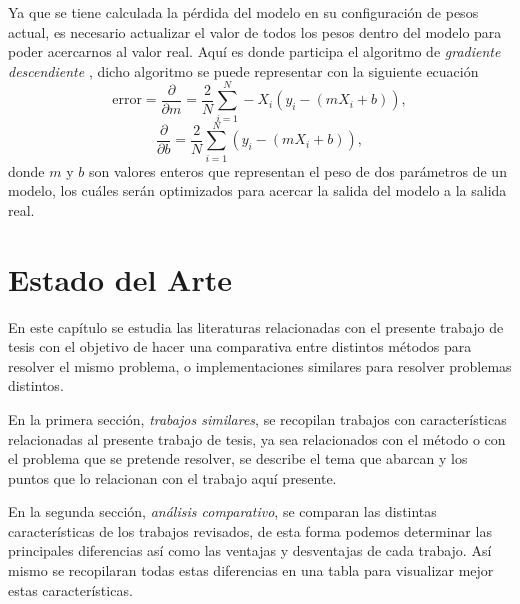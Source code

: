 Ya que se tiene calculada la pérdida del modelo en su configuración de pesos actual, es necesario actualizar el valor de todos los pesos dentro del modelo para poder acercarnos al valor real. Aquí es donde participa el algoritmo de \emph{gradiente descendiente} \citep{alg:gradient}, dicho algoritmo se puede representar con la siguiente ecuación
\begin{equation}
        \text{error} = \frac{\partial}{\partial m} = \frac{2}{N}\sum_{i=1}^{N}-X_i(y_i-(mX_i+b)),
\end{equation}
\begin{equation}
        \frac{\partial}{\partial b} = \frac{2}{N}\sum_{i=1}^{N}(y_i-(mX_i+b)),
\end{equation}
donde $m$ y $b$ son valores enteros que representan el peso de dos parámetros de un modelo, los cuáles serán optimizados para acercar la salida del modelo a la salida real.

%
%           


\chapter{Estado del Arte}
En este capítulo se estudia las literaturas relacionadas con el presente trabajo de tesis con el objetivo de hacer una comparativa entre distintos métodos para resolver el mismo problema, o implementaciones similares para resolver problemas distintos.

En la primera sección, \emph{trabajos similares}, se recopilan trabajos con características relacionadas al presente trabajo de tesis, ya sea relacionados con el método o con el problema que se pretende resolver, se describe el tema que abarcan y los puntos que lo relacionan con el trabajo aquí presente.

En la segunda sección, \emph{análisis comparativo}, se comparan las distintas características de los trabajos revisados, de esta forma podemos determinar las principales diferencias así como las ventajas y desventajas de cada trabajo. Así mismo se recopilaran todas estas diferencias en una tabla para visualizar mejor estas características.

